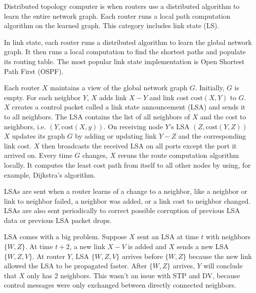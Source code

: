 Distributed topology computer is when routers use a distributed algorithm to learn the
entire network graph. Each router runs a local path computation algorithm on the learned
graph. This category includes link state (LS).

In link state, each router runs a distributed algorithm to learn the global
network graph. It then runs a local computation to find the shortest paths
and populate its routing table. The most popular link state implementation is
Open Shortest Path First (OSPF).

Each router $X$ maintains a view of the global network graph $G$. Initially,
$G$ is empty. For each neighbor $Y$, $X$ adds link $X-Y$ and link cost
$\text{cost}(X, Y)$ to $G$. $X$ creates a control packet called a link state
announcement (LSA) and sends it to all neighbors. The LSA contains the list of
all neighbors of $X$ and the cost to neighbors, i.e. $(Y, \text{cost}(X, y))$.
On receiving node $Y$'s LSA $(Z, \text{cost}(Y, Z))$ $X$ updates its graph $G$
by adding or updating link $Y-Z$ and the corresponding link cost. $X$ then
broadcasts the received LSA on all ports except the port it arrived on.
Every time $G$ changes, $X$ reruns the route computation algorithm locally.
It computes the least cost path from itself to all other nodes by using, for
example, Dijkstra's algorithm.

LSAs are sent when a router learns of a change to a neighbor, like a neighbor
or link to neighbor failed, a neighbor was added, or a link cost to neighbor
changed. LSAs are also sent periodically to correct possible corruption of
previous LSA data or previous LSA packet drops.

LSA comes with a big problem. Suppose $X$ sent an LSA at time $t$ with neighbors
$\{W, Z\}$. At time $t + 2$, a new link $X-V$ is added and $X$ sends a new LSA
$\{W, Z, V\}$. At router $Y$, LSA $\{W, Z, V\}$ arrives before $\{W, Z\}$
because the new link allowed the LSA to be propagated faster. After $\{W, Z\}$
arrives, $Y$ will conclude that $X$ only has 2 neighbors. This wasn't an
issue with STP and DV, because control messages were only exchanged between
directly connected neighbors.

